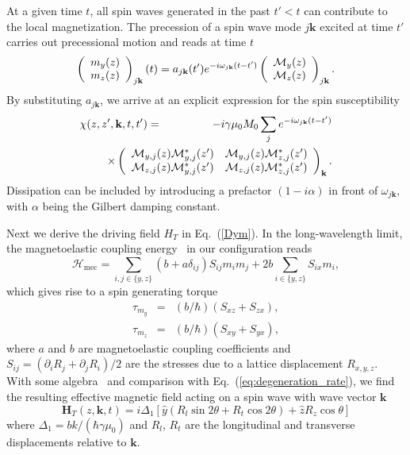\documentclass[aps,prb,twocolumn,superscriptaddress,floatfix]{revtex4}%
\def\be{\begin{equation}}
\def\ee{\end{equation}}
\begin{document}
At a given time $t$, all spin waves generated in the past $t'<t$ can contribute
to the local magnetization. The precession of a spin wave mode  $j\mathbf k$ excited at time $t'$ carries out precessional motion and reads at time $t$
 \begin{equation}
\left(\begin{array}{c}
m_{y}(z)\\
m_{z}(z)
\end{array}\right)_{j\mathbf k}(t)	=	 
a_{j\mathbf{k}}(t')e^{-i\omega_{j\mathbf{k}}(t-t')}\left(\begin{array}{c}
{\cal M}_{y}(z)\\
{\cal M}_{z}(z)
\end{array}\right)_{j\mathbf{k}}.\label{Dym2}
\end{equation}
By substituting $a_{j\mathbf{k}}$, we arrive at an explicit expression for the spin susceptibility
\begin{eqnarray}
\chi(z,z',\mathbf k,t,t')&=&-i\gamma\mu_0 M_0 \sum_j e^{-i\omega_{j\mathbf k}(t-t')}\nonumber\\
&&\hspace{-2cm}\times
\left(\begin{array}{cc}
\mathcal M_{y,j}(z)\mathcal M_{y,j}^\ast(z') &\mathcal M_{y,j}(z)\mathcal M_{z,j}^\ast(z')\\
\mathcal M_{z,j}(z)\mathcal M_{y,j}^\ast(z') &\mathcal M_{z,j}(z)\mathcal M_{z,j}^\ast(z')
\end{array}\right)_{\mathbf k}.
\end{eqnarray}
Dissipation can be included by introducing a prefactor $(1-i\alpha)$ in front of $\omega_{j\mathbf k}$, with $\alpha$ being the Gilbert damping constant.

Next we derive the driving field $H_T$ in Eq.~(\ref{Dym}). In the long-wavelength limit, the magnetoelastic coupling energy~\cite{Kittel58,Akhiezer58} in our configuration reads
\begin{equation}
\mathcal{H}_{\mathrm{mec}}=\sum_{i,j\in\{y,z\}}(b+a\delta_{ij})S_{ij}%
m_{i}m_{j}+2b\sum_{i\in\{y,z\}}S_{ix}m_{i},\label{MEC_H}
\end{equation}
which gives rise to a spin generating torque 
\begin{eqnarray}
\tau_{m_y}&=&(b/\hbar)(S_{xz}+S_{zx}),\\
\tau_{m_z}&=&(b/\hbar)(S_{xy}+S_{yx}),
\end{eqnarray}
where $a$ and $b$ are magnetoelastic coupling coefficients and $S_{ij}=(\partial_i R_j +\partial_j R_i)/2$ are the stresses due to a lattice displacement $R_{x,y,z}$. With some algebra~\cite{Shen15,Schlomann60} and comparison with Eq.~(\ref{eq:degeneration_rate}), we find the resulting effective magnetic field acting on a spin wave with wave vector $\mathbf k$
\be
\mathbf H_{T}(z,\mathbf k,t) =i\Delta_1[\hat y (R_l\sin 2\theta +R_t\cos 2\theta )+\hat z  R_z \cos \theta ] \label{HT}
\ee
where $\Delta_1=b k/(\hbar \gamma \mu_0)$ and $R_l$, $R_t$ are the longitudinal and transverse displacements relative to $\mathbf k$. 
\end{document}

